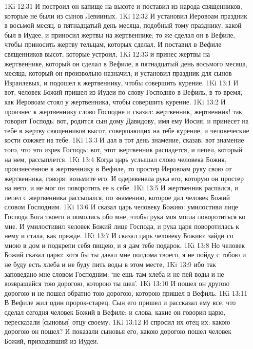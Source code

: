 1Ki 12:31  И построил он капище на высоте и поставил из народа священников, которые не были из сынов Левииных.
1Ki 12:32  И установил Иеровоам праздник в восьмой месяц, в пятнадцатый день месяца, подобный тому празднику, какой был в Иудее, и приносил жертвы на жертвеннике; то же сделал он в Вефиле, чтобы приносить жертву тельцам, которых сделал. И поставил в Вефиле священников высот, которые устроил,
1Ki 12:33  и принес жертвы на жертвеннике, который он сделал в Вефиле, в пятнадцатый день восьмого месяца, месяца, который он произвольно назначил; и установил праздник для сынов Израилевых, и подошел к жертвеннику, чтобы совершить курение.
1Ki 13:1  И вот, человек Божий пришел из Иудеи по слову Господню в Вефиль, в то время, как Иеровоам стоял у жертвенника, чтобы совершить курение.
1Ki 13:2  И произнес к жертвеннику слово Господне и сказал: жертвенник, жертвенник! так говорит Господь: вот, родится сын дому Давидову, имя ему Иосия, и принесет на тебе в жертву священников высот, совершающих на тебе курение, и человеческие кости сожжет на тебе.
1Ki 13:3  И дал в тот день знамение, сказав: вот знамение того, что это изрек Господь: вот, этот жертвенник распадется, и пепел, который на нем, рассыплется.
1Ki 13:4  Когда царь услышал слово человека Божия, произнесенное к жертвеннику в Вефиле, то простер Иеровоам руку свою от жертвенника, говоря: возьмите его. И одеревенела рука его, которую он простер на него, и не мог он поворотить ее к себе.
1Ki 13:5  И жертвенник распался, и пепел с жертвенника рассыпался, по знамению, которое дал человек Божий словом Господним.
1Ki 13:6  И сказал царь человеку Божию: умилостиви лице Господа Бога твоего и помолись обо мне, чтобы рука моя могла поворотиться ко мне. И умилостивил человек Божий лице Господа, и рука царя поворотилась к нему и стала, как прежде.
1Ki 13:7  И сказал царь человеку Божию: зайди со мною в дом и подкрепи себя пищею, и я дам тебе подарок.
1Ki 13:8  Но человек Божий сказал царю: хотя бы ты давал мне полдома твоего, я не пойду с тобою и не буду есть хлеба и не буду пить воды в этом месте,
1Ki 13:9  ибо так заповедано мне словом Господним: `не ешь там хлеба и не пей воды и не возвращайся тою дорогою, которою ты шел'.
1Ki 13:10  И пошел он другою дорогою и не пошел обратно тою дорогою, которою пришел в Вефиль.
1Ki 13:11  В Вефиле жил один пророк-старец. Сын его пришел и рассказал ему все, что сделал сегодня человек Божий в Вефиле; и слова, какие он говорил царю, пересказали [сыновья] отцу своему.
1Ki 13:12  И спросил их отец их: какою дорогою он пошел? И показали сыновья его, какою дорогою пошел человек Божий, приходивший из Иудеи.
